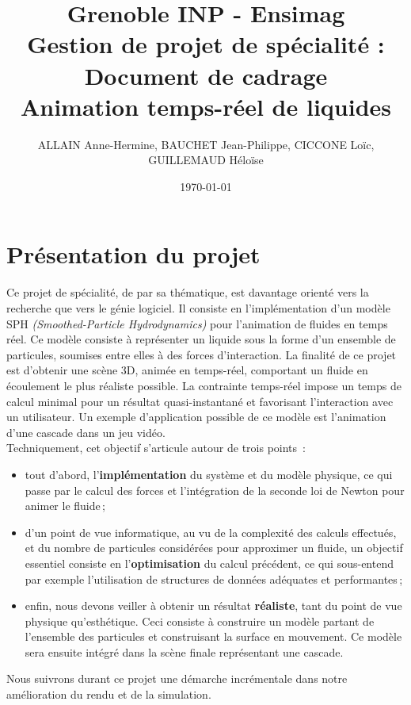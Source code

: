 \documentclass[a4paper,11pt]{article}
\title{\normalsize Grenoble INP - Ensimag \\ Gestion de projet de spécialité : Document de cadrage \\ Animation temps-réel de liquides}
\author{\small ALLAIN Anne-Hermine, BAUCHET Jean-Philippe, CICCONE Loïc, GUILLEMAUD Héloïse}
\date{\small \today}
\begin{document}
\maketitle

\section{Présentation du projet}

Ce projet de spécialité, de par sa thématique, est davantage orienté vers la recherche que vers le génie logiciel. Il consiste en l'implémentation d'un modèle SPH {\em (Smoothed-Particle Hydrodynamics)} pour l'animation de fluides en temps réel. Ce modèle consiste à représenter un liquide sous la forme d'un ensemble de particules, soumises entre elles à des forces d'interaction. La finalité de ce projet est d'obtenir une scène 3D, animée en temps-réel, comportant un fluide en écoulement le plus réaliste possible. La contrainte temps-réel impose un temps de calcul minimal pour un résultat quasi-instantané et favorisant l'interaction avec un utilisateur. Un exemple d'application possible de ce modèle est l'animation d'une cascade dans un jeu vidéo.\\

Techniquement, cet objectif s'articule autour de trois points~: \\

\begin{itemize}
\item tout d'abord, l'\textbf{implémentation} du système et du modèle physique, ce qui passe par le calcul des forces et l'intégration de la seconde loi de Newton pour animer le fluide\,;
\item d'un point de vue informatique, au vu de la complexité des calculs effectués, et du nombre de particules considérées pour approximer un fluide, un objectif essentiel consiste en l'\textbf{optimisation} du calcul précédent, ce qui sous-entend par exemple l'utilisation de structures de données adéquates et performantes\,;
\item enfin, nous devons veiller à obtenir un résultat \textbf{réaliste}, tant du point de vue physique qu'esthétique. Ceci consiste à construire un modèle partant de l'ensemble des particules et construisant la surface en mouvement. Ce modèle sera ensuite intégré dans la scène finale représentant une cascade.\\
\end{itemize}

Nous suivrons durant ce projet une démarche incrémentale dans notre amélioration du rendu et de la simulation. \\
\end{document}
